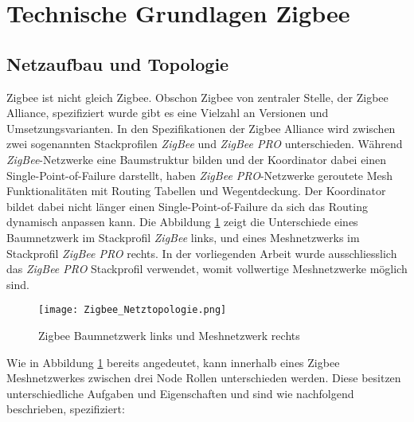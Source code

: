 \clearpage
\section{Technische Grundlagen Zigbee}\label{sec:TechnischeGrundlagenZigbee}

\subsection{Netzaufbau und Topologie}\label{subsec:ZigbeeNetzaufbauundTopologie}
Zigbee ist nicht gleich Zigbee.
Obschon Zigbee von zentraler Stelle, der Zigbee Alliance, spezifiziert wurde gibt es eine Vielzahl an Versionen und Umsetzungsvarianten.
In den Spezifikationen der Zigbee Alliance wird zwischen zwei sogenannten Stackprofilen \textit{ZigBee} und \textit{ZigBee PRO} unterschieden.
Während \textit{ZigBee}-Netzwerke eine Baumstruktur bilden und der Koordinator dabei einen Single-Point-of-Failure darstellt, haben \textit{ZigBee PRO}-Netzwerke geroutete Mesh Funktionalitäten mit Routing Tabellen und Wegentdeckung.
Der Koordinator bildet dabei nicht länger einen Single-Point-of-Failure da sich das Routing dynamisch anpassen kann.
Die Abbildung \ref{fig:NetzwerktopologienZigbee} zeigt die Unterschiede eines Baumnetzwerk im Stackprofil \textit{ZigBee} links, und eines Meshnetzwerks im Stackprofil \textit{ZigBee PRO} rechts.
In der vorliegenden Arbeit wurde ausschliesslich das \textit{ZigBee PRO} Stackprofil verwendet, womit vollwertige Meshnetzwerke möglich sind.

\begin{figure}[h]
	\centering
	\texttt{[image: Zigbee\_Netztopologie.png]}
	\caption{Zigbee Baumnetzwerk links und Meshnetzwerk rechts \cite[S.~221]{markus_krause_rainer_konrad_zigbee_2014}}	\label{fig:NetzwerktopologienZigbee}
\end{figure}

Wie in Abbildung \ref{fig:NetzwerktopologienZigbee} bereits angedeutet, kann innerhalb eines Zigbee Meshnetzwerkes zwischen drei Node Rollen unterschieden werden. Diese besitzen unterschiedliche Aufgaben und Eigenschaften und sind wie nachfolgend beschrieben, spezifiziert:

